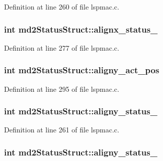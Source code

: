 Definition at line 260 of file lspmac.\-c.

\hypertarget{structmd2StatusStruct_a2feb35ceab8129fd2cc34d1104af8b8f}{
\subsubsection[{alignx\-\_\-status\-\_\-2}]{\setlength{\rightskip}{0pt plus 5cm}int md2\-Status\-Struct\-::alignx\-\_\-status\-\_}}\label{structmd2StatusStruct_a2feb35ceab8129fd2cc34d1104af8b8f}


Definition at line 277 of file lspmac.\-c.

\hypertarget{structmd2StatusStruct_a0d40a01d2aa93c443526e826440f77fc}{
\subsubsection[{aligny\-\_\-act\-\_\-pos}]{\setlength{\rightskip}{0pt plus 5cm}int md2\-Status\-Struct\-::aligny\-\_\-act\-\_\-pos}}\label{structmd2StatusStruct_a0d40a01d2aa93c443526e826440f77fc}


Definition at line 295 of file lspmac.\-c.

\hypertarget{structmd2StatusStruct_a2f2a11fe2fc7a446323def2be465185a}{
\subsubsection[{aligny\-\_\-status\-\_\-1}]{\setlength{\rightskip}{0pt plus 5cm}int md2\-Status\-Struct\-::aligny\-\_\-status\-\_}}\label{structmd2StatusStruct_a2f2a11fe2fc7a446323def2be465185a}


Definition at line 261 of file lspmac.\-c.

\hypertarget{structmd2StatusStruct_a1f98d8b9831e32d77129f9b0f1d7d255}{
\subsubsection[{aligny\-\_\-status\-\_\-2}]{\setlength{\rightskip}{0pt plus 5cm}int md2\-Status\-Struct\-::aligny\-\_\-status\-\_}}\label{structmd2StatusStruct_a1f98d8b9831e32d77129f9b0f1d7d255}


